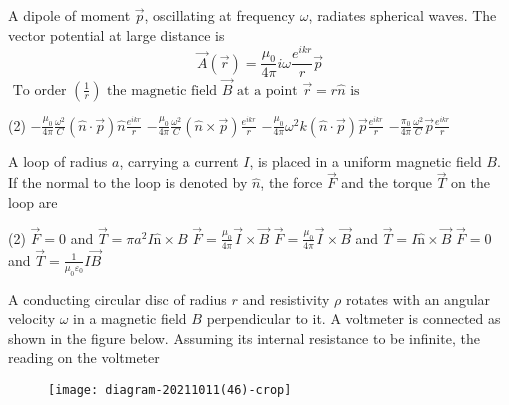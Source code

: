 \begin{enumerate}
\begin{minipage}{\textwidth}
	\item A dipole of moment $\vec{p}$, oscillating at frequency $\omega$, radiates spherical waves. The vector potential at large distance is\\
	$$\vec{A}(\vec{r})=\frac{\mu_{0}}{4 \pi} i \omega \frac{e^{i k r}}{r} \vec{p}$$	
	$\text { To order }\left(\frac{1}{r}\right) \text { the magnetic field } \vec{B} \text { at a point } \vec{r}=r \hat{n} \text { is }$
\end{minipage}
\begin{tasks}(2)
	\task[\textbf{A.}] $-\frac{\mu_{0}}{4 \pi} \frac{\omega^{2}}{C}(\hat{n} \cdot \vec{p}) \hat{n} \frac{e^{i k r}}{r}$
	\task[\textbf{B.}]$-\frac{\mu_{0}}{4 \pi} \frac{\omega^{2}}{C}(\hat{n} \times \vec{p}) \frac{e^{i k r}}{r}$
	\task[\textbf{C.}]$-\frac{\mu_{0}}{4 \pi} \omega^{2} k(\hat{n} \cdot \vec{p}) \vec{p} \frac{e^{i k r}}{r}$
	\task[\textbf{D.}]$-\frac{\pi_{0}}{4 \pi} \frac{\omega^{2}}{C} \vec{p} \frac{e^{i k r}}{r}$
\end{tasks}
\begin{minipage}{\textwidth}
	\item A loop of radius $a$, carrying a current $I$, is placed in a uniform magnetic field $B$. If the normal to the loop is denoted by $\hat{n}$, the force $\vec{F}$ and the torque $\vec{T}$ on the loop are
\end{minipage}
\begin{tasks}(2)
	\task[\textbf{A.}] $\vec{F}=0$ and $\vec{T}=\pi a^{2} I \hat{\mathrm{n}} \times B$
	\task[\textbf{B.}]$\vec{F}=\frac{\mu_{0}}{4 \pi} \vec{I} \times \vec{B}$
	\task[\textbf{C.}]$\vec{F}=\frac{\mu_{0}}{4 \pi} \vec{I} \times \vec{B}$ and $\vec{T}=I \hat{\mathrm{n}} \times \vec{B}$
	\task[\textbf{D.}]$\vec{F}=0$ and $\vec{T}=\frac{1}{\mu_{0} \varepsilon_{0}} I \vec{B}$
\end{tasks}
\begin{minipage}{\textwidth}
	\item A conducting circular disc of radius $r$ and resistivity $\rho$ rotates with an angular velocity $\omega$ in a magnetic field $B$ perpendicular to it. A voltmeter is connected as shown in the figure below. Assuming its internal resistance to be infinite, the reading on the voltmeter
	\begin{figure}[H]
		\centering
		\texttt{[image: diagram-20211011(46)-crop]}
	\end{figure}

\end{minipage}
\end{enumerate}
